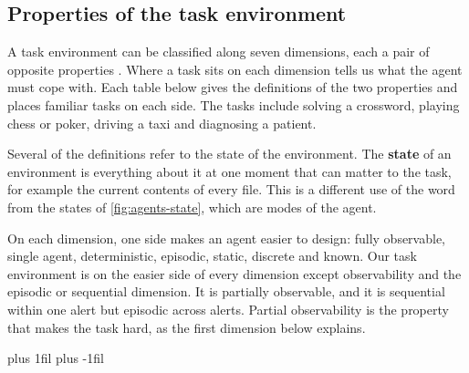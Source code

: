 \subsection{Properties of the task environment}
\label{sec:agents-properties}

A task environment can be classified along seven dimensions, each a pair of opposite properties
\citep[\S2.3.2]{russell2020aima}. Where a task sits on each dimension tells us what the agent must
cope with. Each table below gives the definitions of the two properties and places familiar tasks
on each side. The tasks include solving a crossword, playing chess or poker, driving a taxi and
diagnosing a patient.

Several of the definitions refer to the state of the environment. The \textbf{state} of an
environment is everything about it at one moment that can matter to the task, for example the
current contents of every file. This is a different use of the word from the states of
\cref{fig:agents-state}, which are modes of the agent.

On each dimension, one side makes an agent easier to design: fully observable, single agent,
deterministic, episodic, static, discrete and known. Our task environment is on the easier side of
every dimension except observability and the episodic or sequential dimension. It is partially
observable, and it is sequential within one alert but episodic across alerts. Partial observability
is the property that makes the task hard, as the first dimension below explains.

\par\vskip 0pt plus 1fil\vskip 0pt plus -1fil\relax
